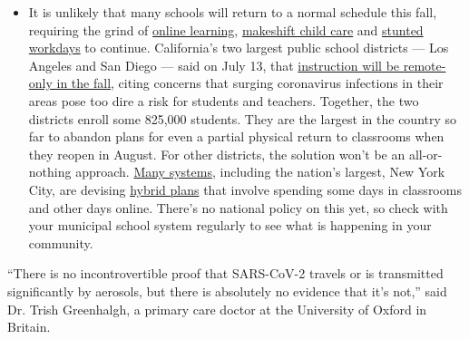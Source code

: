 \begin{itemize}
  \begin{itemize}
  \tightlist
  \item
    It is unlikely that many schools will return to a normal schedule
    this fall, requiring the grind of
    \href{https://www.nytimes.com/2020/06/05/us/coronavirus-education-lost-learning.html?action=click\&pgtype=Article\&state=default\&region=MAIN_CONTENT_3\&context=storylines_faq}{online
    learning},
    \href{https://www.nytimes.com/2020/05/29/us/coronavirus-child-care-centers.html?action=click\&pgtype=Article\&state=default\&region=MAIN_CONTENT_3\&context=storylines_faq}{makeshift
    child care} and
    \href{https://www.nytimes.com/2020/06/03/business/economy/coronavirus-working-women.html?action=click\&pgtype=Article\&state=default\&region=MAIN_CONTENT_3\&context=storylines_faq}{stunted
    workdays} to continue. California's two largest public school
    districts --- Los Angeles and San Diego --- said on July 13, that
    \href{https://www.nytimes.com/2020/07/13/us/lausd-san-diego-school-reopening.html?action=click\&pgtype=Article\&state=default\&region=MAIN_CONTENT_3\&context=storylines_faq}{instruction
    will be remote-only in the fall}, citing concerns that surging
    coronavirus infections in their areas pose too dire a risk for
    students and teachers. Together, the two districts enroll some
    825,000 students. They are the largest in the country so far to
    abandon plans for even a partial physical return to classrooms when
    they reopen in August. For other districts, the solution won't be an
    all-or-nothing approach.
    \href{https://bioethics.jhu.edu/research-and-outreach/projects/eschool-initiative/school-policy-tracker/}{Many
    systems}, including the nation's largest, New York City, are
    devising
    \href{https://www.nytimes.com/2020/06/26/us/coronavirus-schools-reopen-fall.html?action=click\&pgtype=Article\&state=default\&region=MAIN_CONTENT_3\&context=storylines_faq}{hybrid
    plans} that involve spending some days in classrooms and other days
    online. There's no national policy on this yet, so check with your
    municipal school system regularly to see what is happening in your
    community.
  \end{itemize}
\end{itemize}

``There is no incontrovertible proof that SARS-CoV-2 travels or is
transmitted significantly by aerosols, but there is absolutely no
evidence that it's not,'' said Dr. Trish Greenhalgh, a primary care
doctor at the University of Oxford in Britain.

